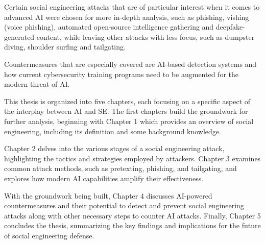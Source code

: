 Certain social engineering attacks that are of particular interest when it comes to advanced AI were chosen for more in-depth analysis, such as phishing, vishing (voice phishing), automated open-source intelligence gathering and deepfake-generated content, while leaving other attacks with less focus, such as dumpster diving, shoulder surfing and tailgating.

Countermeasures that are especially covered are AI-based detection systems and how current cybersecurity training programs need to be augmented for the modern threat of AI.


This thesis is organized into five chapters, each focusing on a specific aspect of the interplay between AI and SE. The first chapters build the groundwork for further analysis, beginning with Chapter 1 which provides an overview of social engineering, including its definition and some background knowledge.

Chapter 2 delves into the various stages of a social engineering attack, highlighting the tactics and strategies employed by attackers. Chapter 3 examines common attack methods, such as pretexting, phishing, and tailgating, and explores how modern AI capabilities amplify their effectiveness.

With the groundwork being built, Chapter 4 discusses AI-powered countermeasures and their potential to detect and prevent social engineering attacks along with other necessary steps to counter AI attacks. Finally, Chapter 5 concludes the thesis, summarizing the key findings and implications for the future of social engineering defense.




